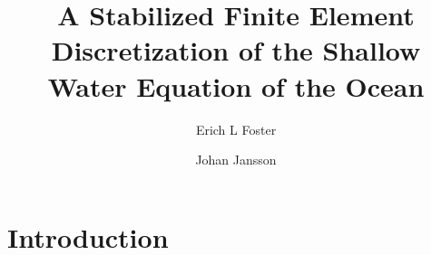 \documentclass{elsarticle}
\begin{document}
  \begin{frontmatter}
    \author[1]{Erich L Foster}

    \author[1]{Johan Jansson}

    \address[1]{Basque Center for Applied Mathematics, Alameda Mazarredo, 14,
      48009 Bilbao, Basque Country -- Spain}

    \title{A Stabilized Finite Element Discretization of the Shallow Water Equation of the Ocean}

    \begin{abstract}
    \end{abstract}
  \end{frontmatter}

  \section{Introduction} \label{sec:Intro}
  


  
  
\end{document}

